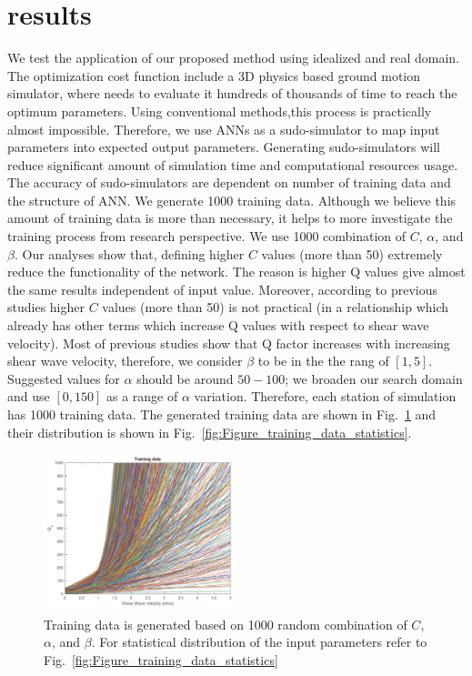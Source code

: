 \section{results}

We test the application of our proposed method using idealized and real domain. The optimization cost function include a 3D physics based ground motion simulator, where needs to evaluate it hundreds of thousands of time to reach the optimum parameters. Using conventional methods,this process is practically almost impossible. Therefore, we use ANNs as a sudo-simulator to map input parameters into expected output parameters. Generating sudo-simulators will reduce significant amount of simulation time and computational resources usage. The accuracy of sudo-simulators are dependent on number of training data and the structure of ANN. We generate 1000 training data. Although we believe this amount of training data is more than necessary, it helps to more investigate the training process from research perspective. We use 1000 combination of $C$, $\alpha$, and $\beta$. Our analyses show that, defining higher $C$ values (more than 50) extremely reduce the functionality of the network. The reason is higher Q values give almost the same results independent of input value. Moreover, according to previous studies higher $C$ values (more than 50) is not practical (in a relationship which already has other terms which increase Q values with respect to shear wave velocity). Most of previous studies show that Q factor increases with increasing shear wave velocity, therefore, we consider $\beta$ to be in the the rang of $[1,5]$. Suggested values for $\alpha$ should be around $50-100$; we broaden our search domain and use $[0,150]$ as a range of $\alpha$ variation. Therefore, each station of simulation has 1000 training data. The generated training data are shown in Fig.~\ref{fig:Figure_training_data} and their distribution is shown in Fig.~\ref{fig:Figure_training_data_statistics}. 

 \begin{figure}[ht]
    \centering
    \includegraphics[width=0.5\textwidth]{figures/pdf/Figure_training_data.pdf}
    \caption{Training data is generated based on 1000 random combination of $C$, $\alpha$, and $\beta$. For statistical distribution of the input parameters refer to Fig.~\ref{fig:Figure_training_data_statistics}}
    \label{fig:Figure_training_data}
\end{figure}

